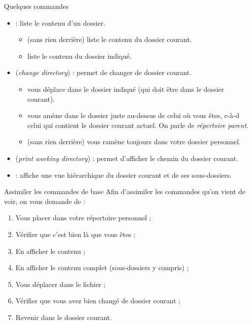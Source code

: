 \documentclass[a4paper,11pt]{style-esi/td}
\begin{document}
		\bigskip
		\begin{theorie}{Quelques commandes}
			\begin{itemize}
			\item {} : liste le contenu d'un dossier.
				\begin{itemize}
					\item {}
						(sans rien derrière) liste le contenu du dossier courant.
					\item {}
						liste le contenu du dossier indiqué.
				\end{itemize}
			\item {} (\textit{change directory}) :
				permet de changer de dossier courant.
				\begin{itemize}
					\item {}
						vous déplace dans le dossier indiqué (qui doit être dans le dossier courant).
					\item {}
						vous amène dans le dossier juste au-dessus de celui où vous êtes, 
						c-à-d celui qui contient le dossier courant actuel.
						On parle de \textit{répertoire parent}.
					\item {}
						(sans rien derrière) vous ramène toujours dans votre dossier personnel.
				\end{itemize}
			\item {} (\textit{print working directory})  :
				permet d'afficher le chemin du dossier courant.
			\item {} :
				affiche une vue hiérarchique du dossier courant et de ses sous-dossiers.
			\end{itemize}
		\end{theorie}

		\begin{Exercice}{Assimiler les commandes de base}
			Afin d'assimiler les commandes qu'on vient de voir,
			on vous demande de :
			\begin{enumerate}
				\item Vous placer dans votre répertoire personnel ;
				\item Vérifier que c'est bien là que vous êtes ;
				\item En afficher le contenu ;
				\item En afficher le contenu complet (sous-dossiers y compris) ;
				\item Vous déplacer dans le fichier  ;
				\item Vérifier que vous avez bien changé de dossier courant ;
				\item Revenir dans le dossier courant.
			\end{enumerate}
		\end{Exercice}
\end{document}
